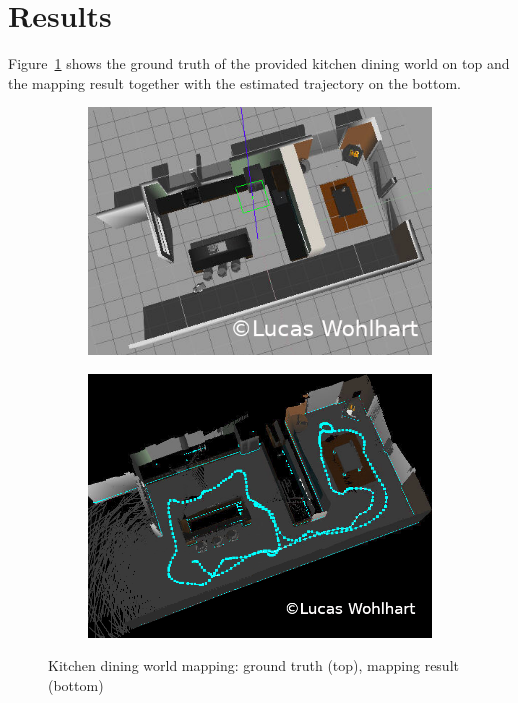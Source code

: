 \documentclass[10pt,journal,compsoc]{IEEEtran}
\begin{document}
\section{Results}


Figure~\ref{fig:kitchen_map} shows the ground truth of the provided kitchen dining world on top and the mapping result together with the estimated trajectory on the bottom.

\begin{figure}[thpb]
    \centering
    \begin{subfigure}[b]{0.45\textwidth}
        \includegraphics[width=\linewidth]{img/kitchen_map_ground_truth.png}
    \end{subfigure}
    \begin{subfigure}[b]{0.45\textwidth}
        \includegraphics[width=\linewidth]{img/kitchen_map.png}
    \end{subfigure}
    \caption{\label{fig:kitchen_map}Kitchen dining world mapping: ground truth (top), mapping result (bottom)}    
\end{figure}
\end{document}
